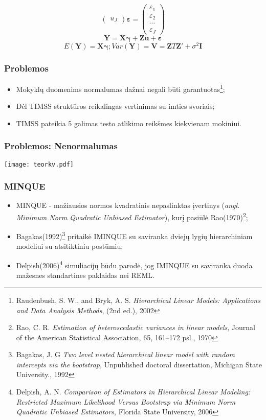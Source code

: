 \documentclass[utf8,hyperref={unicode,pdftex}]{beamer}
\begin{document}
\begin{frame}
\[\begin{pmatrix}
u_{J}
 \end{pmatrix} 
\boldsymbol{\varepsilon}=
 \begin{pmatrix}
\varepsilon_{1}   \\
\varepsilon_{2}  \\
  \cdots  \\
\varepsilon_J
 \end{pmatrix} 
\]
\large
\begin{equation}
\mathbf{Y}=\mathbf{X}\boldsymbol{\gamma}+\mathbf{Z}\mathbf{u}+\boldsymbol{\varepsilon}
\end{equation}
\small
\[E(\mathbf{Y}) = \mathbf{X}\boldsymbol{\gamma}; Var(\mathbf{Y})=\mathbf{V}=\mathbf{Z}T\mathbf{Z}'+\sigma^2\mathbf{I}\]
\end{frame}

%
%


\begin{frame}
\frametitle{Problemos}
\large
\begin{itemize}
\item Mokyklų duomenims normalumas dažnai negali būti garantuotas\footnote{Raudenbush, S. W., and Bryk, A. S.  \textit{Hierarchical Linear Models: Applications and
Data Analysis Methods}, (2nd ed.), 2002};
\item Dėl TIMSS struktūros reikalingas vertinimas su imties svoriais;
\item TIMSS pateikia 5 galimas testo atlikimo reikšmes kiekvienam mokiniui.
\end{itemize}
\end{frame}

\begin{frame}
\frametitle{Problemos: Nenormalumas}
\texttt{[image: teorkv.pdf]}
\end{frame}

\begin{frame}
\frametitle{MINQUE}
\begin{itemize}
\item MINQUE - mažiausios normos kvadratinis nepaslinktas įvertinys (\textit{angl. Minimum Norm Quadratic Unbiased Estimator}), kurį pasiūlė Rao(1970)\footnote{Rao, C. R.  \textit{Estimation of heteroscedastic variances in linear models}, Journal of the American Statistical Association, 65, 161–172 psl., 1970};
\item Bagakas(1992)\footnote{Bagakas, J. G  \textit{ Two level nested hierarchical linear model with random intercepts
via the bootstrap}, Unpublished doctoral dissertation, Michigan State University., 1992} pritaikė IMINQUE su saviranka dviejų lygių hierarchiniam modeliui su atsitiktiniu postūmiu;
\item Delpish(2006)\footnote{Delpish, A. N.  \textit{Comparison of Estimators in Hierarchical Linear Modeling: Restricted Maximum Likelihood Versus Bootstrap via Minimum Norm Quadratic Unbiased Estimators}, Florida State University, 2006} simuliacijų būdu parodė, jog IMINQUE su saviranka duoda mažesnes standartines paklaidas nei REML.
\end{itemize}
\end{frame}
\end{document}

